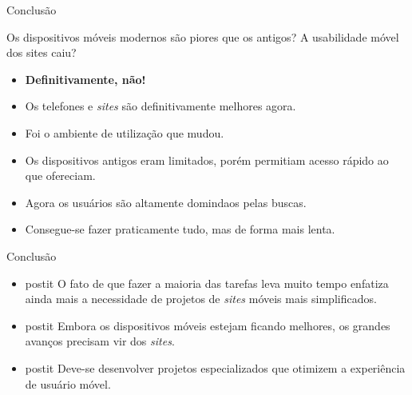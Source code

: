 \begin{frame}{Conclusão}
\begin{block}{Os dispositivos móveis modernos são piores que os antigos? \break \break A usabilidade móvel dos sites caiu?}
  \begin{itemize}
    \bigskip
    \item<1-> \textbf{Definitivamente, não!}
    \item<2-> Os telefones e \emph{sites} são definitivamente melhores agora.
    \item<3-> Foi o ambiente de utilização que mudou.
    \item<4-> Os dispositivos antigos eram limitados, porém permitiam acesso rápido ao que ofereciam.
    \item<5-> Agora os usuários são altamente domindaos pelas buscas.
    \item<6-> Consegue-se fazer praticamente tudo, mas de forma mais lenta.
  \end{itemize}
\end{block}
\end{frame}

\begin{frame}{Conclusão}
\begin{block}{}
  \begin{itemize}
    \item<1->[]
      \begin{beamercolorbox}[sep=1em]{postit}
        O fato de que fazer a maioria das tarefas leva muito tempo enfatiza ainda mais a necessidade de projetos de \emph{sites} móveis mais simplificados.
      \end{beamercolorbox}
    \bigskip
    \item<2->[]
      \begin{beamercolorbox}[sep=1em]{postit}
        Embora os dispositivos móveis estejam ficando melhores, os grandes avanços precisam vir dos \emph{sites}.
      \end{beamercolorbox}
    \bigskip
    \item<3- >[]
      \begin{beamercolorbox}[sep=1em]{postit}
        Deve-se desenvolver projetos especializados que otimizem a experiência de usuário móvel.
      \end{beamercolorbox}
  \end{itemize}
\end{block}
\end{frame}
